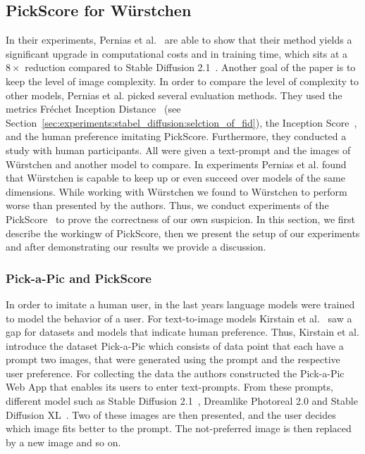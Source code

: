\subsection{PickScore for W\"urstchen}
In their experiments, Pernias et al.~\cite{pernias2024wrstchen} are able to show
that their method yields a significant upgrade in computational costs and in
training time, which sits at a $8\times$ reduction compared to Stable Diffusion
2.1~\cite{rombach2023sd_2_1}. Another goal of the paper is to keep the level of
image complexity. In order to compare the level of complexity to other models,
Pernias et al. picked several evaluation methods. They used the metrics
Fr\'echet Inception Distance~\cite{heusel2018ganstrainedtimescaleupdate} (see
Section~\ref{sec:experiments:stabel_diffusion:selction_of_fid}), the Inception
Score~\cite{ding2021cogviewmasteringtexttoimagegeneration}, and the human preference imitating
PickScore. Furthermore, they conducted a study with human participants. All were
given a text-prompt and the images of W\"urstchen and another model to compare.
In experiments Pernias et al. found that W\"urstchen is capable to keep up or
even succeed over models of the same dimensions. While working with W\"urstchen
we found to W\"urstchen to perform worse than presented by the authors. Thus, we
conduct experiments of the PickScore~\cite{kirstain2023pickapic} to
prove the correctness of our own suspicion. In this section, we first describe
the workingw of PickScore, then we present the setup of our experiments and
after demonstrating our results we provide a discussion.

\subsubsection{Pick-a-Pic and PickScore}
In order to imitate a human user, in the last years language models were trained
to model the behavior of a user. For text-to-image models Kirstain et
al.~\cite{kirstain2023pickapic} saw a gap for datasets and models that
indicate human preference. Thus, Kirstain et al. introduce the dataset
Pick-a-Pic which consists of data point that each have a prompt two images, that
were generated using the prompt and the respective user preference. For
collecting the data the authors constructed the Pick-a-Pic Web App that enables
its users to enter text-prompts. From these prompts, different model such as
Stable Diffusion 2.1~\cite{rombach2023sd_2_1}, Dreamlike Photoreal 2.0 and
Stable Diffusion XL~\cite{podell2024sdxl}. Two of these images are then
presented, and the user decides which image fits better to the prompt. The
not-preferred image is then replaced by a new image and so on.

